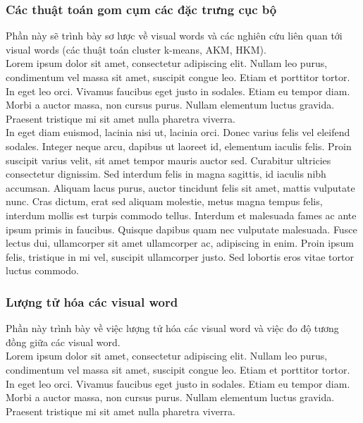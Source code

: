   \subsubsection{Các thuật toán gom cụm các đặc trưng cục bộ}
   
   Phần này sẽ trình bày sơ lược về visual words và các nghiên cứu liên quan tới visual words (các thuật toán cluster k-means, AKM, HKM).\\
Lorem ipsum dolor sit amet, consectetur adipiscing elit. Nullam leo purus, condimentum vel massa sit amet, suscipit congue leo. Etiam et porttitor tortor. In eget leo orci. Vivamus faucibus eget justo in sodales. Etiam eu tempor diam. Morbi a auctor massa, non cursus purus. Nullam elementum luctus gravida. Praesent tristique mi sit amet nulla pharetra viverra.\\

In eget diam euismod, lacinia nisi ut, lacinia orci. Donec varius felis vel eleifend sodales. Integer neque arcu, dapibus ut laoreet id, elementum iaculis felis. Proin suscipit varius velit, sit amet tempor mauris auctor sed. Curabitur ultricies consectetur dignissim. Sed interdum felis in magna sagittis, id iaculis nibh accumsan. Aliquam lacus purus, auctor tincidunt felis sit amet, mattis vulputate nunc. Cras dictum, erat sed aliquam molestie, metus magna tempus felis, interdum mollis est turpis commodo tellus. Interdum et malesuada fames ac ante ipsum primis in faucibus. Quisque dapibus quam nec vulputate malesuada. Fusce lectus dui, ullamcorper sit amet ullamcorper ac, adipiscing in enim. Proin ipsum felis, tristique in mi vel, suscipit ullamcorper justo. Sed lobortis eros vitae tortor luctus commodo.\\
   \subsubsection{Lượng tử hóa các visual word}
   Phần này trình bày về việc lượng tử hóa các visual word và việc đo độ tương đồng giữa các visual word. \\   
Lorem ipsum dolor sit amet, consectetur adipiscing elit. Nullam leo purus, condimentum vel massa sit amet, suscipit congue leo. Etiam et porttitor tortor. In eget leo orci. Vivamus faucibus eget justo in sodales. Etiam eu tempor diam. Morbi a auctor massa, non cursus purus. Nullam elementum luctus gravida. Praesent tristique mi sit amet nulla pharetra viverra.\\

